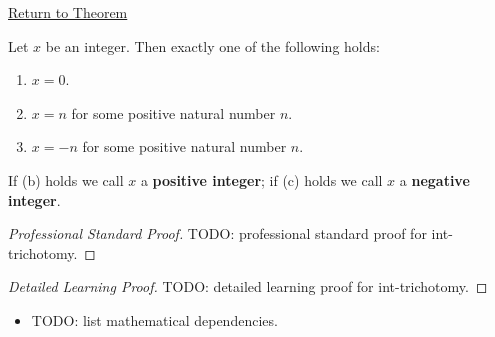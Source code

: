 \newpage
{}
\label{prf:int-trichotomy}

\begin{remark*}[Return]
\hyperref[lem:int-trichotomy]{Return to Theorem}
\end{remark*}

\begin{theorem*}
Let $x$ be an integer. Then exactly one of the following holds:
\begin{enumerate}
  \item[(a)] $x = 0$.
  \item[(b)] $x = n$ for some positive natural number $n$.
  \item[(c)] $x = -n$ for some positive natural number $n$.
\end{enumerate}
If (b) holds we call $x$ a \textbf{positive integer};
if (c) holds we call $x$ a \textbf{negative integer}.
\end{theorem*}

\begin{proof}[Professional Standard Proof]
\LRAProofBodyStart
TODO: professional standard proof for int-trichotomy.
\end{proof}

\begin{proof}[Detailed Learning Proof]
\LRAProofBodyStart
TODO: detailed learning proof for int-trichotomy.
\end{proof}

\begin{remark*}
\end{remark*}

\begin{dependencies}
\begin{itemize}
  \item TODO: list mathematical dependencies.
\end{itemize}
\end{dependencies}

\clearpage
